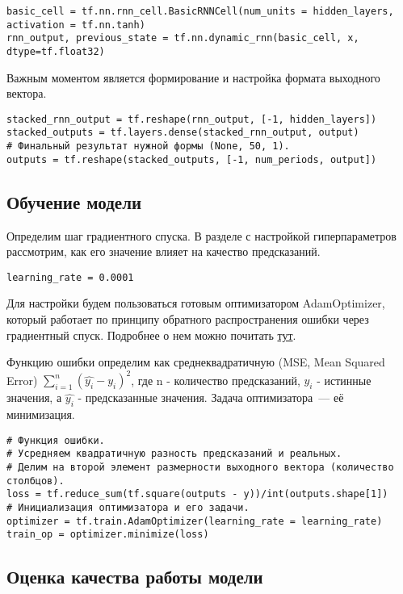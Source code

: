 \documentclass[12pt, a4paper]{article}
\begin{document}
\begin{verbatim}
basic_cell = tf.nn.rnn_cell.BasicRNNCell(num_units = hidden_layers,
activation = tf.nn.tanh)
rnn_output, previous_state = tf.nn.dynamic_rnn(basic_cell, x,
dtype=tf.float32)
\end{verbatim}

Важным моментом является формирование и настройка формата выходного вектора.

\begin{verbatim}
stacked_rnn_output = tf.reshape(rnn_output, [-1, hidden_layers])
stacked_outputs = tf.layers.dense(stacked_rnn_output, output)
# Финальный результат нужной формы (None, 50, 1).
outputs = tf.reshape(stacked_outputs, [-1, num_periods, output])
\end{verbatim}

\subsection{Обучение модели}
Определим шаг градиентного спуска. В разделе с настройкой гиперпараметров рассмотрим, как его значение влияет на качество предсказаний.
\begin{verbatim}
learning_rate = 0.0001
\end{verbatim}

Для настройки будем пользоваться готовым оптимизатором AdamOptimizer, который работает по принципу обратного распространения ошибки через градиентный спуск. Подробнее о нем можно почитать \href{https://arxiv.org/pdf/1412.6980.pdf}{тут}.

Функцию ошибки определим как среднеквадратичную (MSE, Mean Squared Error) $\sum_{i=1}^n (\hat{y_i} - y_i)^2$, где n - количество предсказаний, $y_i$ - истинные значения, а $\hat{y_i}$ - предсказанные значения. Задача оптимизатора~---  её минимизация.

\begin{verbatim}
# Функция ошибки.
# Усредняем квадратичную разность предсказаний и реальных.
# Делим на второй элемент размерности выходного вектора (количество столбцов).
loss = tf.reduce_sum(tf.square(outputs - y))/int(outputs.shape[1])
# Инициализация оптимизатора и его задачи.
optimizer = tf.train.AdamOptimizer(learning_rate = learning_rate)
train_op = optimizer.minimize(loss)
\end{verbatim}

\subsection{Оценка качества работы модели}
\end{document}
